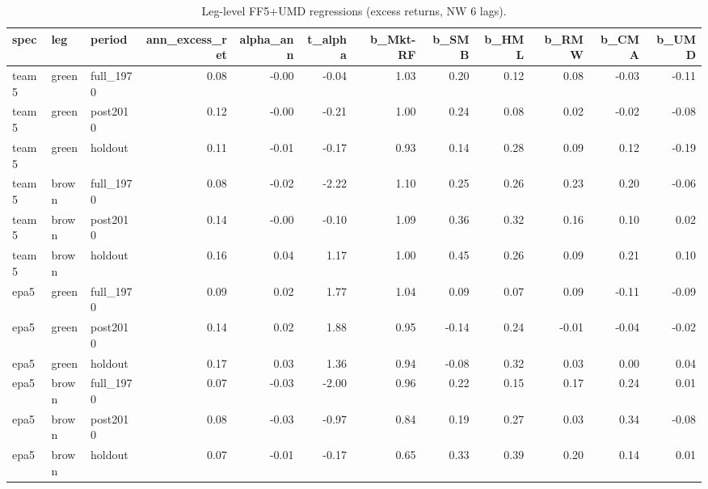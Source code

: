 \begin{table}
\caption{Leg-level FF5+UMD regressions (excess returns, NW 6 lags).}
\label{tab:m4_legs_reg}
\begin{tabular}{lllrrrrrrrrr}
\toprule
spec & leg & period & ann\_excess\_ret & alpha\_ann & t\_alpha & b\_Mkt-RF & b\_SMB & b\_HML & b\_RMW & b\_CMA & b\_UMD \\
\midrule
team5 & green & full\_1970 & 0.08 & -0.00 & -0.04 & 1.03 & 0.20 & 0.12 & 0.08 & -0.03 & -0.11 \\
team5 & green & post2010 & 0.12 & -0.00 & -0.21 & 1.00 & 0.24 & 0.08 & 0.02 & -0.02 & -0.08 \\
team5 & green & holdout & 0.11 & -0.01 & -0.17 & 0.93 & 0.14 & 0.28 & 0.09 & 0.12 & -0.19 \\
team5 & brown & full\_1970 & 0.08 & -0.02 & -2.22 & 1.10 & 0.25 & 0.26 & 0.23 & 0.20 & -0.06 \\
team5 & brown & post2010 & 0.14 & -0.00 & -0.10 & 1.09 & 0.36 & 0.32 & 0.16 & 0.10 & 0.02 \\
team5 & brown & holdout & 0.16 & 0.04 & 1.17 & 1.00 & 0.45 & 0.26 & 0.09 & 0.21 & 0.10 \\
epa5 & green & full\_1970 & 0.09 & 0.02 & 1.77 & 1.04 & 0.09 & 0.07 & 0.09 & -0.11 & -0.09 \\
epa5 & green & post2010 & 0.14 & 0.02 & 1.88 & 0.95 & -0.14 & 0.24 & -0.01 & -0.04 & -0.02 \\
epa5 & green & holdout & 0.17 & 0.03 & 1.36 & 0.94 & -0.08 & 0.32 & 0.03 & 0.00 & 0.04 \\
epa5 & brown & full\_1970 & 0.07 & -0.03 & -2.00 & 0.96 & 0.22 & 0.15 & 0.17 & 0.24 & 0.01 \\
epa5 & brown & post2010 & 0.08 & -0.03 & -0.97 & 0.84 & 0.19 & 0.27 & 0.03 & 0.34 & -0.08 \\
epa5 & brown & holdout & 0.07 & -0.01 & -0.17 & 0.65 & 0.33 & 0.39 & 0.20 & 0.14 & 0.01 \\
\bottomrule
\end{tabular}
\end{table}
